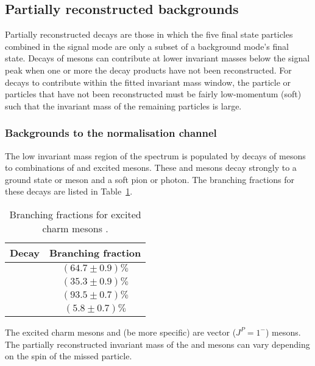 \subsection{Partially reconstructed backgrounds}
\label{sec:B2DsKK_partrecocomps}

Partially reconstructed decays are those in which the five final state particles combined in the signal mode are only a subset of a background mode's final state.
Decays of \B mesons can contribute at lower invariant masses below the signal peak when one or more the decay products have not been reconstructed. 
For decays to contribute within the fitted \Bp invariant mass window, the particle or particles that have not been reconstructed must be fairly low-momentum (soft) such that the invariant mass of the remaining particles is large.

\subsubsection{Backgrounds to the normalisation channel}

The low invariant mass region of the \Dsp\Dzb spectrum is populated by decays of \Bp mesons to combinations of \D and excited \D mesons. These \Dstarzb and \Dss mesons decay strongly to a ground state \Dzb or \Dsp meson and a soft pion or photon. The branching fractions for these decays are listed in Table~\ref{tab:dstar_BFs}.


\begin{table}[h]
\centering
\begin{tabular}{ l c }

\hline
Decay                           & Branching fraction \\ 
\hline
\decay{\Dstarzb}{\Dzb\Pgamma}   &   $(64.7\pm0.9)\%$ \\
\decay{\Dstarzb}{\Dzb\piz}      &   $(35.3\pm0.9)\%$ \\
\decay{\Dssp}{\Dsp\Pgamma}        &   $(93.5\pm0.7)\%$ \\
\decay{\Dssp}{\Dsp\piz}           &   $(5.8\pm0.7)\%$ \\
\hline

\end{tabular}
\caption{Branching fractions for excited charm mesons \cite{PDG2016}. } 
\label{tab:dstar_BFs}  
\end{table}

The excited charm mesons \Dstarzb and \Dss (be more specific) are vector ($J^{P} = 1^{-}$) mesons. The partially reconstructed invariant mass of the \Dsp and \Dzb mesons can vary depending on the spin of the missed particle.

